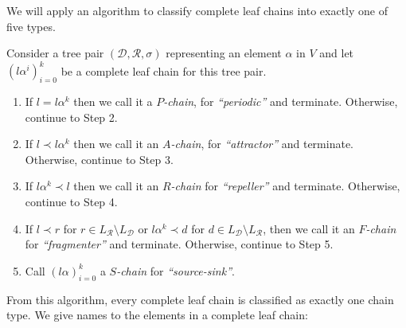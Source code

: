 \documentclass[12pt]{amsart}
\newcommand{\D}{\mathcal{D}}
\newcommand{\R}{\mathcal{R}}
\begin{document}
        We will apply an algorithm to classify complete leaf chains into exactly one of five types.
        
        \begin{algorithm}
        \label{chain-classification}
            Consider a tree pair $(\D,\R,\sigma)$ representing an element $\alpha$ in $V$ and let $(l \alpha^i)_{i=0}^k$ be a complete leaf chain for this tree pair. 

            \begin{enumerate}[label=Step \arabic*:]
        
            \item If $l = l \alpha^k$ then we call it a \textit{$P$-chain}, for \textit{``periodic''} and terminate. Otherwise, continue to Step 2.
            \item If $l \prec l \alpha^k$ then we call it an \textit{$A$-chain}, for \textit{``attractor''} and terminate. Otherwise, continue to Step 3.
            \item If $l \alpha^k \prec l$ then we call it an \textit{$R$-chain} for \textit{``repeller''} and terminate. Otherwise, continue to Step 4.
            \item If $l \prec r$ for $r \in L_\R \setminus L_\D$ or $l \alpha^k \prec d$ for $d \in L_\D \setminus L_\R$, then we call it an \textit{$F$-chain} for \textit{``fragmenter''} and terminate. Otherwise, continue to Step 5.
            \item Call $(l\alpha)_{i=0}^k$ a \textit{$S$-chain} for \textit{``source-sink''}.
        
        \end{enumerate}
    \end{algorithm}    
    
    From this algorithm, every complete leaf chain is classified as exactly one chain type. We give names to the elements in a complete leaf chain:
    
\end{document}
